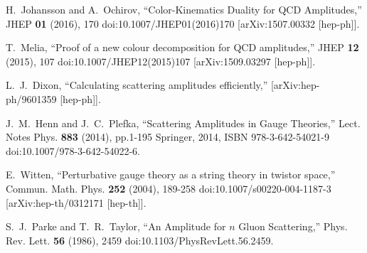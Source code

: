 H.~Johansson and A.~Ochirov,
``Color-Kinematics Duality for QCD Amplitudes,''
JHEP \textbf{01} (2016), 170
doi:10.1007/JHEP01(2016)170
[arXiv:1507.00332 [hep-ph]].

T.~Melia,
``Proof of a new colour decomposition for QCD amplitudes,''
JHEP \textbf{12} (2015), 107
doi:10.1007/JHEP12(2015)107
[arXiv:1509.03297 [hep-ph]].

L.~J.~Dixon,
``Calculating scattering amplitudes efficiently,''
[arXiv:hep-ph/9601359 [hep-ph]].

J.~M.~Henn and J.~C.~Plefka,
``Scattering Amplitudes in Gauge Theories,''
Lect. Notes Phys. \textbf{883} (2014), pp.1-195
Springer, 2014,
ISBN 978-3-642-54021-9
doi:10.1007/978-3-642-54022-6.

E.~Witten,
``Perturbative gauge theory as a string theory in twistor space,''
Commun. Math. Phys. \textbf{252} (2004), 189-258
doi:10.1007/s00220-004-1187-3
[arXiv:hep-th/0312171 [hep-th]].

S.~J.~Parke and T.~R.~Taylor,
``An Amplitude for $n$ Gluon Scattering,''
Phys. Rev. Lett. \textbf{56} (1986), 2459
doi:10.1103/PhysRevLett.56.2459.
